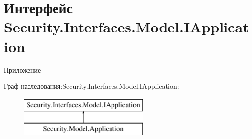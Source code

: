 \hypertarget{interface_security_1_1_interfaces_1_1_model_1_1_i_application}{}\section{Интерфейс Security.\+Interfaces.\+Model.\+I\+Application}
\label{interface_security_1_1_interfaces_1_1_model_1_1_i_application}


Приложение  


Граф наследования\+:Security.\+Interfaces.\+Model.\+I\+Application\+:\begin{figure}[H]
\begin{center}
\leavevmode
\includegraphics[height=2.000000cm]{df/d5d/interface_security_1_1_interfaces_1_1_model_1_1_i_application}
\end{center}
\end{figure}
